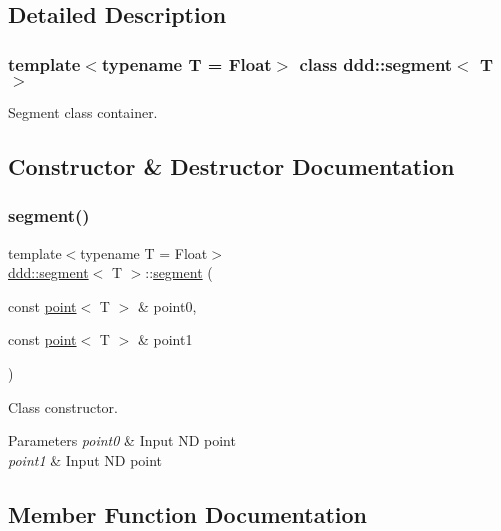\subsection{Detailed Description}
\subsubsection*{template$<$typename T = Float$>$\newline
class ddd\+::segment$<$ T $>$}

Segment class container. 

\subsection{Constructor \& Destructor Documentation}
\mbox{\label{classddd_1_1segment_afdfcc983efc30b3dee0af2603795775b}} 
\subsubsection{\texorpdfstring{segment()}{segment()}}
{\footnotesize\ttfamily template$<$typename T = Float$>$ \\
\hyperlink{classddd_1_1segment}{ddd\+::segment}$<$ T $>$\+::\hyperlink{classddd_1_1segment}{segment} (\begin{DoxyParamCaption}\item[{const \hyperlink{classddd_1_1point}{point}$<$ T $>$ \&}]{point0,  }\item[{const \hyperlink{classddd_1_1point}{point}$<$ T $>$ \&}]{point1 }\end{DoxyParamCaption})\hspace{0.3cm}{\ttfamily [inline]}}



Class constructor. 


\begin{DoxyParams}{Parameters}
{\em point0} & Input ND point \\
\hline
{\em point1} & Input ND point \\
\hline
\end{DoxyParams}


\subsection{Member Function Documentation}
\mbox{\label{classddd_1_1segment_a9c33e619d61ee3fc61a7767ebc2948f5}} 
